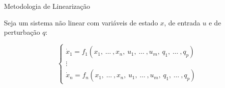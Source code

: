 \begin{frame}{Metodologia de Linearização}


Seja um sistema não linear com variáveis de estado $x$, de entrada $u$ e de perturbação $q$:

\begin{equation*}
\left\{
\begin{array}{l}
\dot{x}_1 = f_1(x_1,~\dots~,x_n,~u_1,~\dots~,u_m,~q_1,~\dots~,q_p)\\
\vdots\\
\dot{x}_n = f_n(x_1,~\dots~,x_n,~u_1,~\dots~,u_m,~q_1,~\dots~,q_p)
\end{array}
\right.
\end{equation*}



\end{frame}
